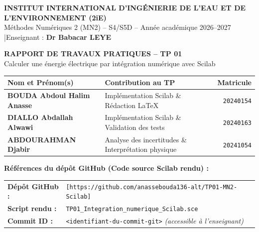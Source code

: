 \documentclass[10pt,a4paper]{article}
\begin{document}
\begin{center}
    {\Large\bfseries\color{primary} INSTITUT INTERNATIONAL D'INGÉNIERIE DE L'EAU ET DE L'ENVIRONNEMENT (2iE)}\\[2pt]
    {\normalsize Méthodes Numériques 2 (MN2) -- S4/S5D -- Année académique 2026--2027 \quad|\quad Enseignant : \textbf{Dr Babacar LEYE}}\\[6pt]
    
    \colorbox{primary}{%
        \parbox{\dimexpr\textwidth-2\fboxsep\relax}{%
            \centering\vspace{5pt}
            {\Large\bfseries\color{white} RAPPORT DE TRAVAUX PRATIQUES -- TP 01}\\[2pt]
            {\normalsize\color{white} Calculer une énergie électrique par intégration numérique avec Scilab}
            \vspace{5pt}
        }%
    }
\end{center}

\vspace{2pt}

\begin{tabularx}{\textwidth}{@{}l >{\raggedright\arraybackslash}X r@{}}
\toprule
\textbf{Nom et Prénom(s)} & \textbf{Contribution au TP} & \textbf{Matricule} \\
\midrule
\textbf{BOUDA Abdoul Halim Anasse} & Implémentation Scilab \& Rédaction LaTeX & \texttt{20240154} \\
\textbf{DIALLO Abdallah Alwawi} & Implémentation Scilab \& Validation des tests & \texttt{20240163} \\
\textbf{ABDOURAHMAN Djabir} & Analyse des incertitudes \& Interprétation physique & \texttt{20241054} \\
\bottomrule
\end{tabularx}

\vspace{3pt}

\noindent\colorbox{secondary!8}{%
  \parbox{\dimexpr\textwidth-2\fboxsep\relax}{%
    \vspace{3pt}
    \textbf{\color{secondary}Références du dépôt GitHub (Code source Scilab rendu) :}\\[2pt]
    \begin{tabularx}{\linewidth}{@{}l >{\raggedright\arraybackslash}X@{}}
      \textbf{Dépôt GitHub :} & \texttt{[https://github.com/anassebouda136-alt/TP01-MN2-Scilab]} \\
      \textbf{Script rendu :} & \texttt{TP01\_Integration\_numerique\_Scilab.sce} \\
      \textbf{Commit ID :} & \texttt{<identifiant-du-commit-git>} \emph{(accessible à l'enseignant)}
    \end{tabularx}
    \vspace{3pt}
  }%
}
\end{document}
